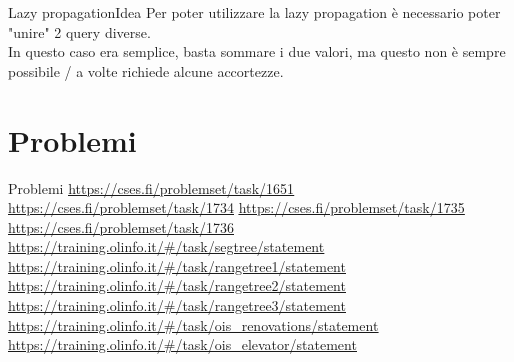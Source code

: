 \documentclass[compress]{beamer}
\begin{document}
\begin{frame}{}
\end{frame}

\begin{frame}{Lazy propagation}{Idea}
    Per poter utilizzare la lazy propagation è necessario poter "unire" 2 query diverse.\\
    In questo caso era semplice, basta sommare i due valori, ma questo non è sempre possibile / a volte 
    richiede alcune accortezze.\\
\end{frame}

\section{Problemi}

\begin{frame}{Problemi}
    \small{\underline{\url{https://cses.fi/problemset/task/1651}}}
    \small{\underline{\url{https://cses.fi/problemset/task/1734}}}
    \small{\underline{\url{https://cses.fi/problemset/task/1735}}}
    \small{\underline{\url{https://cses.fi/problemset/task/1736}}}
    \small{\underline{\url{https://training.olinfo.it/\#/task/segtree/statement}}}
    \small{\underline{\url{https://training.olinfo.it/\#/task/rangetree1/statement}}}
    \small{\underline{\url{https://training.olinfo.it/\#/task/rangetree2/statement}}}
    \small{\underline{\url{https://training.olinfo.it/\#/task/rangetree3/statement}}}
    \small{\underline{\url{https://training.olinfo.it/\#/task/ois_renovations/statement}}}
    \small{\underline{\url{https://training.olinfo.it/\#/task/ois_elevator/statement}}}
\end{frame}
\end{document}
